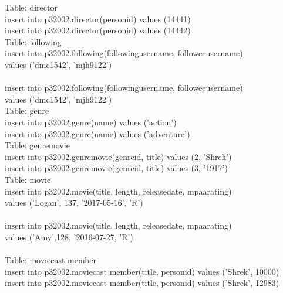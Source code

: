 \documentclass[12pt]{article}
\begin{document}
    \noindent Table: director \\
    insert into p320\textunderscore02.director(person\textunderscore id)
    values (14441)\\
    insert into p320\textunderscore02.director(person\textunderscore id)
    values (14442)\\

    \noindent Table: following \\
    insert into p320\textunderscore02.following(following\textunderscore username, followee\textunderscore username) \\
    values ('dmc1542', 'mjh9122')\\ \\
    insert into p320\textunderscore02.following(following\textunderscore username, followee\textunderscore username) \\
    values ('dmc1542', 'mjh9122')\\

    \noindent Table: genre \\
    insert into p320\textunderscore02.genre(name) values ('action')\\
    insert into p320\textunderscore02.genre(name) values ('adventure')\\

    \noindent Table: genre\textunderscore movie \\
    insert into p320\textunderscore02.genre\textunderscore movie(genre\textunderscore id, title) values (2, 'Shrek')\\
    insert into p320\textunderscore02.genre\textunderscore movie(genre\textunderscore id, title) values (3, '1917')\\

    \noindent Table: movie \\
    insert into p320\textunderscore02.movie(title, length, release\textunderscore date, mpaa\textunderscore rating)\\
    values ('Logan', 137, '2017-05-16', 'R') \\ \\
    insert into p320\textunderscore02.movie(title, length, release\textunderscore date, mpaa\textunderscore rating)\\
    values ('Amy',128, '2016-07-27, 'R')\\ \\

    \noindent Table: movie\textunderscore cast \textunderscore member\\
    insert into p320\textunderscore02.movie\textunderscore cast \textunderscore member(title, person\textunderscore id) values ('Shrek', 10000)\\
    insert into p320\textunderscore02.movie\textunderscore cast \textunderscore member(title, person\textunderscore id) values ('Shrek', 12983)\\
\end{document}

